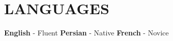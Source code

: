 \documentclass[11pt,a4paper,roman,colorlinks,linkcolor=blue,filecolor=magenta,urlcolor=cyan]{moderncv}        %
\begin{document}


\vspace{-2mm}
\section{LANGUAGES}
\textbf{English} - Fluent \enspace \enspace \textbf{Persian} - Native \enspace \enspace \textbf{French} - Novice

    
    
    
\end{document}
